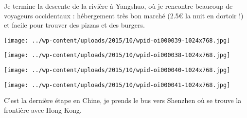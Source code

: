  Je termine la descente de la rivière à Yangshuo, où je rencontre beaucoup de voyageurs occidentaux : hébergement très bon marché (2.5€ la nuit en dortoir !) et facile pour trouver des pizzas et des burgers. 
\begin{center} \texttt{[image: ../wp-content/uploads/2015/10/wpid-oi000039-1024x768.jpg]} \end{center}
\begin{center} \texttt{[image: ../wp-content/uploads/2015/10/wpid-oi000038-1024x768.jpg]} \end{center}
\begin{center} \texttt{[image: ../wp-content/uploads/2015/10/wpid-oi000040-1024x768.jpg]} \end{center}
\begin{center} \texttt{[image: ../wp-content/uploads/2015/10/wpid-oi000041-1024x768.jpg]} \end{center}

 C'est la dernière étape en Chine, je prends le bus vers Shenzhen où se trouve la frontière avec Hong Kong.
